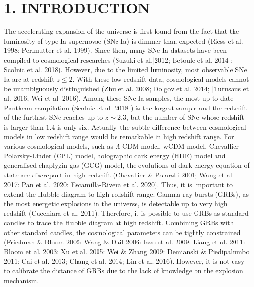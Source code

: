 \documentclass[10pt, a4paper]{article}
\begin{document}
\section*{1. INTRODUCTION }
The accelerating expansion of the universe is first found from the fact that the luminosity of type Ia supernovae (SNe Ia) is dimmer than expected (Riess et al. 1998: Perlmutter et al. 1999). Since then, many SNe Ia datasets have been compiled to cosmological researches (Suzuki et al.|2012; Betoule et al. 2014 ; Scolnic et al. 2018). However, due to the limited luminosity, most observable SNe Ia are at redshift $z \leq 2$. With these low redshift data, cosmological models cannot be unambiguously distinguished (Zhu et al. 2008; Dolgov et al. 2014; |Tutusaus et al. 2016; Wei et al. 2016). Among these SNe Ia samples, the most up-to-date Pantheon compilation (Scolnic et al. 2018 ) is the largest sample and the redshift of the furthest SNe reaches up to $z \sim 2.3$, but the number of SNe whose redshift is larger than $1.4$ is only six. Actually, the subtle difference between cosmological models in low redshift range would be remarkable in high redshift range. For various cosmological models, such as $\Lambda$ CDM model, wCDM model, Chevallier-Polarsky-Linder (CPL) model, holographic dark energy (HDE) model and generalised chaplygin gas (GCG) model, the evolutions of dark energy equation of state are discrepant in high redshift (Chevallier \& Polarski 2001; Wang et al. 2017: Pan et al. 2020: Escamilla-Rivera et al. 2020). Thus, it is important to extend the Hubble diagram to high redshift range. Gamma-ray bursts (GRBs), as the most energetic explosions in the universe, is detectable up to very high redshift (Cucchiara et al. 2011). Therefore, it is possible to use GRBs as standard candles to trace the Hubble diagram at high redshift. Combining GRBs with other standard candles, the cosmological parameters can be tightly constrained (Friedman \& Bloom 2005: Wang \& Dail 2006: Izzo et al. 2009: Liang et al. 2011: Bloom et al. 2003: Xu et al. 2005: Wei \& Zhang 2009: Demianski \& Piedipalumbo 2011; Cai et al. 2013; Chang et al. 2014; Lin et al. 2016). However, it is not easy to calibrate the distance of GRBs due to the lack of knowledge on the explosion mechanism.
\end{document}
